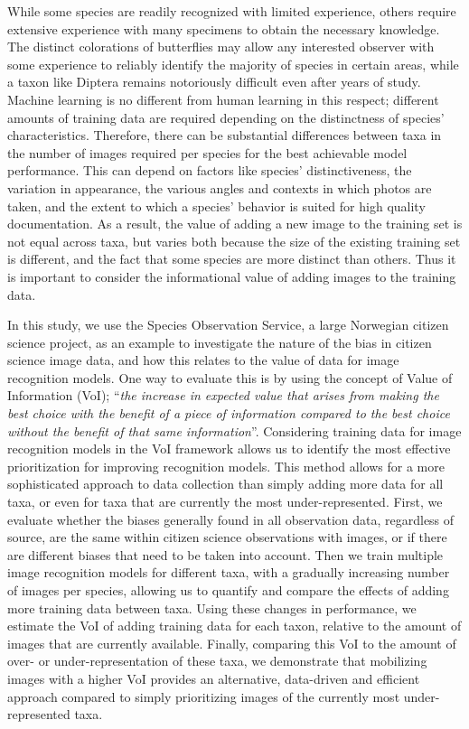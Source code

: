 \documentclass{article}
\begin{document}
While some species are readily recognized with limited experience, others require extensive experience with many specimens to obtain the necessary knowledge. The distinct colorations of butterflies may allow any interested observer with some experience to reliably identify the majority of species in certain areas, while a taxon like Diptera remains notoriously difficult even after years of study. Machine learning is no different from human learning in this respect; different amounts of training data are required depending on the distinctness of species' characteristics. Therefore, there can be substantial differences between taxa in the number of images required per species for the best achievable model performance. This can depend on factors like species' distinctiveness, the variation in appearance, the various angles and contexts in which photos are taken, and the extent to which a species' behavior is suited for high quality documentation.\autocite{Wldchen2018_27,Terry2020, vanhorn2018} As a result, the value of adding a new image to the training set is not equal across taxa, but varies both because the size of the existing training set is different, and the fact that some species are more distinct than others. Thus it is important to consider the informational value of adding images to the training data.

In this study, we use the Species Observation Service, a large Norwegian citizen science project, as an example to investigate the nature of the bias in citizen science image data, and how this relates to the value of data for image recognition models. One way to evaluate this is by using the concept of Value of Information (VoI); ``\textit{the increase in expected value that arises from making the best choice with the benefit of a piece of information compared to the best choice without the benefit of that same information}''\autocite{Keisler2013}. Considering training data for image recognition models in the VoI framework allows us to identify the most effective prioritization for improving recognition models. This method allows for a more sophisticated approach to data collection than simply adding more data for all taxa, or even for taxa that are currently the most under-represented. First, we evaluate whether the biases generally found in all observation data, regardless of source, are the same within citizen science observations with images, or if there are different biases that need to be taken into account. Then we train multiple image recognition models for different taxa, with a gradually increasing number of images per species, allowing us to quantify and compare the effects of adding more training data between taxa. Using these changes in performance, we estimate the VoI of adding training data for each taxon, relative to the amount of images that are currently available. Finally, comparing this VoI to the amount of over- or under-representation of these taxa, we demonstrate that mobilizing images with a higher VoI provides an alternative, data-driven and efficient approach compared to simply prioritizing images of the currently most under-represented taxa.
\end{document}
